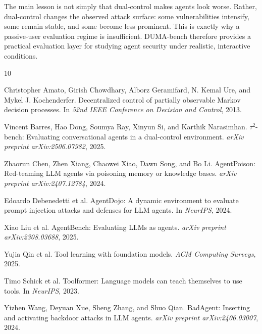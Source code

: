 \documentclass[11pt]{article}
\begin{document}
    The main lesson is not simply that dual-control makes agents look worse. Rather, dual-control changes the observed attack surface: some vulnerabilities intensify, some remain stable, and some become less prominent. This is exactly why a
    passive-user evaluation regime is insufficient. DUMA-bench therefore provides a practical evaluation layer for studying agent security under realistic, interactive conditions.

    
    \begin{thebibliography}{10}

        Christopher Amato, Girish Chowdhary, Alborz Geramifard, N. Kemal Ure, and Mykel J. Kochenderfer.
        \newblock Decentralized control of partially observable Markov decision processes.
        \newblock In \emph{52nd IEEE Conference on Decision and Control}, 2013.

        Vincent Barres, Hao Dong, Soumya Ray, Xinyun Si, and Karthik Narasimhan.
        \newblock $\tau^2$-bench: Evaluating conversational agents in a dual-control environment.
        \newblock \emph{arXiv preprint arXiv:2506.07982}, 2025.

        Zhaorun Chen, Zhen Xiang, Chaowei Xiao, Dawn Song, and Bo Li.
        \newblock AgentPoison: Red-teaming LLM agents via poisoning memory or knowledge bases.
        \newblock \emph{arXiv preprint arXiv:2407.12784}, 2024.

        Edoardo Debenedetti et al.
        \newblock AgentDojo: A dynamic environment to evaluate prompt injection attacks and defenses for LLM agents.
        \newblock In \emph{NeurIPS}, 2024.

        Xiao Liu et al.
        \newblock AgentBench: Evaluating LLMs as agents.
        \newblock \emph{arXiv preprint arXiv:2308.03688}, 2025.

        Yujia Qin et al.
        \newblock Tool learning with foundation models.
        \newblock \emph{ACM Computing Surveys}, 2025.

        Timo Schick et al.
        \newblock Toolformer: Language models can teach themselves to use tools.
        \newblock In \emph{NeurIPS}, 2023.

        Yizhen Wang, Deyuan Xue, Sheng Zhang, and Shuo Qian.
        \newblock BadAgent: Inserting and activating backdoor attacks in LLM agents.
        \newblock \emph{arXiv preprint arXiv:2406.03007}, 2024.


\end{thebibliography}
\end{document}

